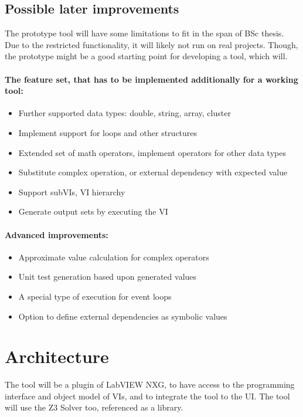 \subsection{Possible later improvements}

The prototype tool will have some limitations to fit in the span of BSc thesis. Due to the restricted functionality, it will likely not run on real projects. Though, the prototype might be a good starting point for developing a tool, which will.

\paragraph{The feature set, that has to be implemented additionally for a working tool:}

\begin{itemize}
  \item Further supported data types: double, string, array, cluster
  \item Implement support for loops and other structures
  \item Extended set of math operators, implement operators for other data types
  \item Substitute complex operation, or external dependency with expected value
  \item Support subVIs, VI hierarchy
   \item Generate output sets by executing the VI
  \end{itemize}
  

\paragraph{Advanced improvements:}

\begin{itemize}
  \item Approximate value calculation for complex operators
  \item Unit test generation based upon generated values
  \item A special type of execution for event loops
  \item Option to define external dependencies as symbolic values
  \end{itemize}

\section{Architecture}

The tool will be a plugin of LabVIEW NXG, to have access to the programming interface and object model of VIs, and to integrate the tool to the UI. The tool will use the Z3 Solver too, referenced as a library.

